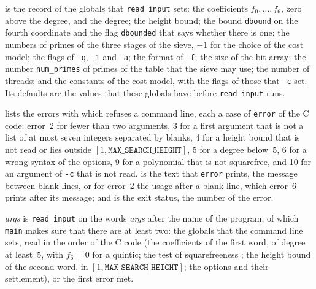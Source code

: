 \begin{definition}\label{def:Cli.Input}
  \leanok
   is the record of the globals that \texttt{read\_input} sets: the
  coefficients $f_0, \dots, f_6$, zero above the degree, and the degree; the height bound; the
  bound \texttt{dbound} on the fourth coordinate and the flag \texttt{dbounded} that says whether
  there is one; the numbers of primes of the three stages of the sieve, $-1$ for the choice of the
  cost model; the flags of \texttt{-q}, \texttt{-1} and \texttt{-a}; the format of \texttt{-f}; the
  size of the bit array; the number \texttt{num\_primes} of primes of the table that the sieve may
  use; the number of threads; and the constants of the cost model, with the flags of those that
  \texttt{-c} set. Its defaults are the values that these globals have before \texttt{read\_input}
  runs.
\end{definition}

\begin{definition}\label{def:Cli.Failure}
  \leanok
   lists the errors with which \jpoints{} refuses a command line, each a
  case of \texttt{error} of the C code: error~2 for fewer than two arguments, 3 for a first
  argument that is not a list of at most seven integers separated by blanks, 4 for a height bound
  that is not read or lies outside
  $[1, \mathtt{MAX\_SEARCH\_HEIGHT}]$, 5 for a degree below~$5$, 6 for a wrong syntax of the
  options, 9 for a polynomial that is not squarefree, and 10 for an argument of \texttt{-c} that is
  not read.  is the text that \texttt{error} prints, the message
  between blank lines, or for error~2 the usage after a blank line, which error~6 prints after its
  message; and  is the exit status, the number of the error.
\end{definition}

\begin{definition}\label{def:Cli.readInput}
  \leanok
   \textit{args} is \texttt{read\_input} on the words \textit{args}
  after the name of the program, of which \texttt{main} makes sure that there are at least two: the
  globals that the command line sets, read in the order of the C code (the coefficients of the first
  word, of degree at least~$5$, with $f_6 = 0$ for a quintic; the test of squarefreeness
  ; the height bound of the second word, in
  $[1, \mathtt{MAX\_SEARCH\_HEIGHT}]$; the options and their settlement), or the first error met.
\end{definition}

